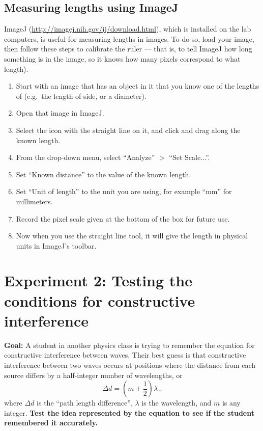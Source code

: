 \subsection{Measuring lengths using ImageJ}

ImageJ (\url{http://imagej.nih.gov/ij/download.html}), which is installed on the lab computers, is useful for measuring lengths in images. To do so, load your image, then follow these steps to calibrate the ruler --- that is, to tell ImageJ how long something is in the image, so it knows how many pixels correspond to what length).

\begin{enumerate}
	\item Start with an image that has an object in it that you know one of the lengths of (e.g.\ the length of side, or a diameter).
	
	\item Open that image in ImageJ.
	
	\item Select the icon with the straight line on it, and click and drag along the known length.
	
	\item From the drop-down menu, select ``Analyze'' $>$ ``Set Scale...''.
	
	\item Set ``Known distance'' to the value of the known length.
	
	\item Set ``Unit of length'' to the unit you are using, for example ``mm'' for millimeters.
	
	\item Record the pixel scale given at the bottom of the box for future use.
	
	\item Now when you use the straight line tool, it will give the length in physical units in ImageJ's toolbar.
\end{enumerate}

\section{Experiment 2: Testing the conditions for constructive interference}

\textbf{Goal:} A student in another physics class is trying to remember the equation for constructive interference between waves. Their best guess is that constructive interference between two waves occurs at positions where the distance from each source differs by a half-integer number of wavelengths, or
\begin{equation}
 \Delta d = (m+\frac{1}{2})\lambda \,,
\end{equation}
where $\Delta d$ is the ``path length difference'', $\lambda$ is the wavelength, and $m$ is any integer. \textbf{Test the idea represented by the equation to see if the student remembered it accurately.}

